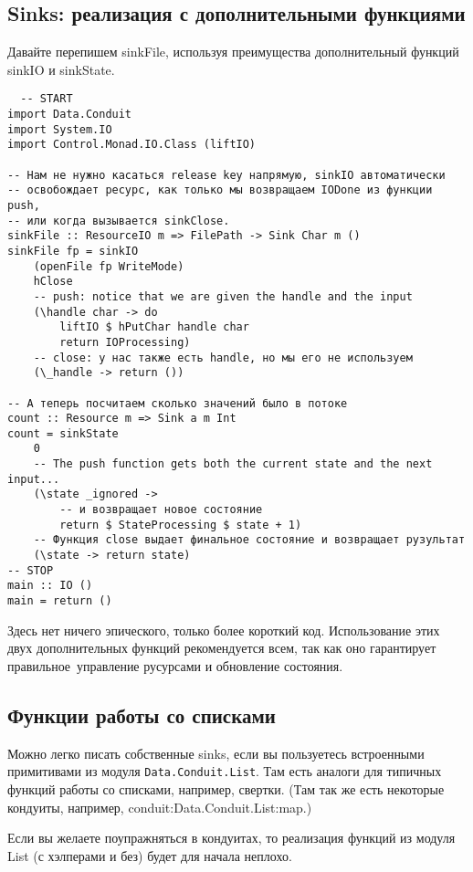 \subsection{Sinks: реализация с дополнительными функциями}
Давайте перепишем sinkFile, используя преимущества дополнительный функций 
sinkIO и sinkState.
\begin{lstlisting}
  -- START
import Data.Conduit
import System.IO
import Control.Monad.IO.Class (liftIO)

-- Нам не нужно касаться release key напрямую, sinkIO автоматически
-- освобождает ресурс, как только мы возвращаем IODone из функции push,
-- или когда вызывается sinkClose.
sinkFile :: ResourceIO m => FilePath -> Sink Char m ()
sinkFile fp = sinkIO
    (openFile fp WriteMode)
    hClose
    -- push: notice that we are given the handle and the input
    (\handle char -> do
        liftIO $ hPutChar handle char
        return IOProcessing)
    -- close: у нас также есть handle, но мы его не используем
    (\_handle -> return ())

-- А теперь посчитаем сколько значений было в потоке
count :: Resource m => Sink a m Int
count = sinkState
    0
    -- The push function gets both the current state and the next input...
    (\state _ignored ->
        -- и возвращает новое состояние
        return $ StateProcessing $ state + 1)
    -- Функция close выдает финальное состояние и возвращает рузультат
    (\state -> return state)
-- STOP
main :: IO ()
main = return ()
\end{lstlisting}
Здесь нет ничего эпического, только более короткий код. Использование этих двух
дополнительных  функций рекомендуется всем, так как оно гарантирует правильное\
управление русурсами и обновление состояния.

\subsection{Функции работы со списками}
Можно легко писать собственные sinks, если вы пользуетесь встроенными примитивами из
модуля \verb*|Data.Conduit.List|. Там есть аналоги для типичных функций работы со
списками, например, свертки. (Там так же есть некоторые кондуиты,
например, conduit:Data.Conduit.List:map.)

Если вы желаете поупражняться в кондуитах, то реализация функций из модуля List (с
хэлперами и без) будет для начала неплохо.

